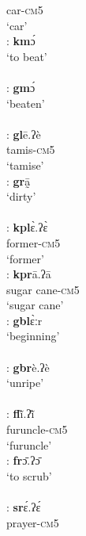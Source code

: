 \documentclass[output=paper]{langscibook}
\begin{document}
\begin{exe}
\begin{multicols}{2}
\begin{xlisti}
            {} car-\textsc{cm}5\\
           {}  `car'\\
        \ex \glll [km]:      \textbf{km}ɔ́\\
            {}      {`to beat'}\\
            {} {} \\
        \ex \glll [gm]:      \textbf{gm}ɔ́\\
            {}      `beaten'\\
            {} {} \\
        \ex \glll [gl]:       \textbf{gl}ē.ʔè\\
            {}          tamis-\textsc{cm}5\\
            {} ‘tamise’\\
        \ex \glll [gr]:       \textbf{gr}ā̰  \\
            {}      `dirty'\\
            {} {}\\
        \ex  \glll [kpl]:      \textbf{kpl}ɛ̀.ʔɛ̀ \\
            {}          former-\textsc{cm}5\\
            {}          `former'\\
        \ex \glll [kpr]:     \textbf{kpr}ā.ʔā\\
            {}          {sugar cane-\textsc{cm}5}\\
            {} {`sugar cane'}\\
        \ex \glll [gbl]:     \textbf{gbl}ɛ̀ːr\\
            {}          `beginning'\\
            {} {}\\
        \ex \glll [gbr]:     \textbf{gbr}è.ʔè\\
            {}          `unripe'\\
            {} {}\\
        \ex \glll [fl]: \textbf{fl}ĩ̀.ʔĩ̀  \\
            {} furuncle-\textsc{cm}5\\
            {} `furuncle'\\
        \ex \glll [fr]:        \textbf{fr}ɔ̄.ʔɔ̄ \\
            {} {`to scrub'}\\
            {} {} \\
        \ex \glll [sr]:        \textbf{sr}ɛ́.ʔɛ́\\
            {}      prayer-\textsc{cm}5\\

\end{xlisti}
\end{multicols}
\end{exe}
\end{document}
